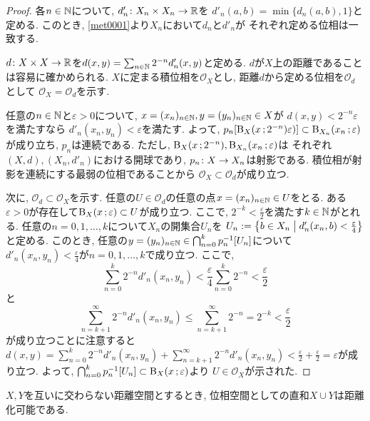 \documentclass[uplatex, dvipdfmx, a4paper, 12pt, class=jsbook, crop=false]{standalone}
\begin{document}
\begin{proof}
	各$ n \in \mathbb{N} $について, $ d'_n \colon X_n \times X_n \to \mathbb{R} $を
	$ d'_n(a, b) = \min\{d_n(a,b), 1\} $と定める.
	このとき, \cref{met0001}より$ X_n $において$ d_n $と$ d'_n $が
	それぞれ定める位相は一致する.

	$ d \colon X \times X \to \mathbb{R} $を$ d(x, y) = \sum_{n \in \mathbb{N}}
	2^{-n} d'_n(x, y) $と定める.
	$ d $が$ X $上の距離であることは容易に確かめられる.
	$ X $に定まる積位相を$ \mathcal{O}_X $とし,
	距離$ d $から定める位相を$ \mathcal{O}_d $として
	$ \mathcal{O}_X = \mathcal{O}_d $を示す.

	任意の$ n \in \mathbb{N} $と$ \varepsilon > 0 $について,
	$ x=(x_n)_{n \in \mathbb{N}}, y=(y_n)_{n \in \mathbb{N}} \in X $が
	$ d(x, y) < 2^{-n}\varepsilon $を満たすなら
	$ d'_n(x_n, y_n) < \varepsilon $を満たす.
	よって, $ \mapset{p_n}{\topballsf{X}{x}{2^{-n}} \varepsilon)} \subset
	\topballsf{X_n}{x_n}{\varepsilon} $が成り立ち, $ p_n $は連続である.
	ただし, $ \topballsf{X}{x}{2^{-n}}, \topballsf{X_n}{x_n}{\varepsilon} $は
	それぞれ$ (X, d), (X_n, d'_n) $における開球であり,
	$ p_n\colon X\to X_n $は射影である.
	積位相が射影を連続にする最弱の位相であることから
	$ \mathcal{O}_X \subset \mathcal{O}_d $が成り立つ.

	次に, $ \mathcal{O}_d \subset \mathcal{O}_X $を示す.
	任意の$ U \in \mathcal{O}_d $の任意の点$ x=(x_n)_{n \in \mathbb{N}} \in U $をとる.
	ある$ \varepsilon > 0 $が存在して$ \topballsf{X}{x}{\varepsilon} \subset U $が成り立つ.
	ここで, $ 2^{-k} < \frac{\varepsilon}{2} $を満たす$ k \in \mathbb{N} $がとれる.
	任意の$ n =0, 1, \ldots, k $について$ X_n $の開集合$ U_n $を
	$ U_n \defeq \setcomp{b \in X_n}{d'_n(x_n, b) < \frac{\varepsilon}{4}} $と定める.
	このとき, 任意の$ y=(y_n)_{n \in \N} \in
	\bigcap_{n=0}^k \mapinvset{p_n}{U_n} $について
	$ d'_n(x_n, y_n) < \frac{\varepsilon}{4} $が$ n = 0, 1, \ldots, k $で成り立つ.
	ここで,
	\[ \sum_{n=0}^{k} 2^{-n} d'_n(x_n, y_n) <
	\frac{\varepsilon}{4}\sum_{n=0}^{k} 2^{-n} < \frac{\varepsilon}{2} \]と
	\[ \sum_{n=k+1}^\infty 2^{-n} d'_n(x_n, y_n) \leq \sum_{n=k+1}^\infty 2^{-n}
	= 2^{-k} < \frac{\varepsilon}{2} \]が成り立つことに注意すると
	$ d(x, y) = \sum_{n=0}^{k} 2^{-n} d'_n(x_n, y_n) +
	\sum_{n=k+1}^\infty 2^{-n} d'_n(x_n, y_n) < \frac{\varepsilon}{2} +
	\frac{\varepsilon}{2} = \varepsilon $が成り立つ.
	よって, $ \bigcap_{n=0}^k \mapinvset{p_n}{U_n} \subset \topballsf{X}{x}{\varepsilon} $より
	$ U \in \mathcal{O}_X $が示された.
\end{proof}

\begin{proposition}
	$ X, Y $を互いに交わらない距離空間とするとき,
	位相空間としての直和$ X \cup Y $は距離化可能である.
\end{proposition}
\end{document}
